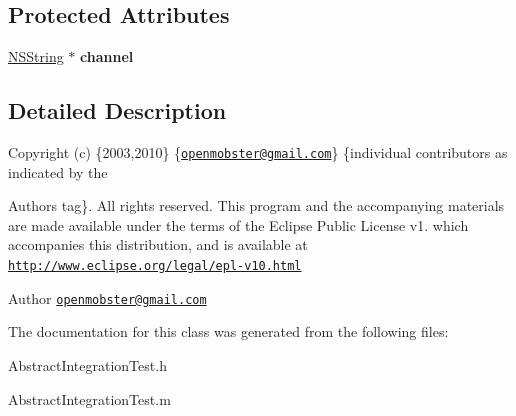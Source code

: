 \subsection*{\-Protected \-Attributes}
\begin{DoxyCompactItemize}
\item 
\hypertarget{interface_abstract_integration_test_a9b68202e805cadd80325dfcd2d543f0a}{
\hyperlink{class_n_s_string}{\-N\-S\-String} $\ast$ {\bfseries channel}}
\label{interface_abstract_integration_test_a9b68202e805cadd80325dfcd2d543f0a}

\end{DoxyCompactItemize}


\subsection{\-Detailed \-Description}
\-Copyright (c) \{2003,2010\} \{\href{mailto:openmobster@gmail.com}{\tt openmobster@gmail.\-com}\} \{individual contributors as indicated by the \begin{DoxyAuthor}{\-Authors}
tag\}. \-All rights reserved. \-This program and the accompanying materials are made available under the terms of the \-Eclipse \-Public \-License v1. which accompanies this distribution, and is available at \href{http://www.eclipse.org/legal/epl-v10.html}{\tt http\-://www.\-eclipse.\-org/legal/epl-\/v10.\-html}
\end{DoxyAuthor}
\begin{DoxyAuthor}{\-Author}
\href{mailto:openmobster@gmail.com}{\tt openmobster@gmail.\-com} 
\end{DoxyAuthor}


\-The documentation for this class was generated from the following files\-:\begin{DoxyCompactItemize}
\item 
\-Abstract\-Integration\-Test.\-h\item 
\-Abstract\-Integration\-Test.\-m\end{DoxyCompactItemize}
